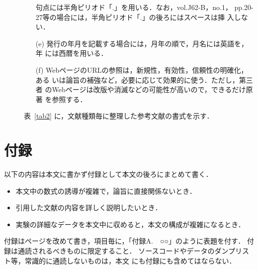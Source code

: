 \documentclass[main]{subfiles}
\begin{document}
\begin{description}
\begin{itemize}
	   句点には半角ピリオド「.」を用いる．なお，vol.J62-B，no.1，
	   pp.20-27等の場合には，半角ピリオド「.」の後ろにはスペースは挿
	   入しない．
\item[(e)] 発行の年月を記載する場合には，月年の順で，月名には英語を，年
	   には西暦を用いる．
\item[(f)] WebページのURLの参照は，新規性，有効性，信頼性の明確化，ある
	   いは論旨の補強など，必要に応じて効果的に使う．ただし，第三者
	   のWebページは改版や消滅などの可能性が高いので，できるだけ原著
	   を参照する．
\end{itemize}
表~\ref{tab2} に，文献種類毎に整理した参考文献の書式を示す．
\end{description}



\section{付録}
以下の内容は本文に書かず付録として本文の後ろにまとめて書く．

\begin{itemize}
\item 本文中の数式の誘導が複雑で，論旨に直接関係ないとき．
\item 引用した文献の内容を詳しく説明したいとき．
\item 実験の詳細なデータを本文中に収めると，本文の構成が複雑になるとき．
\end{itemize}

付録はページを改めて書き，項目毎に，「付録A.　○○」のように表題を付す．
付録は通読されるべきものに限定すること．
ソースコードやデータのダンプリスト等，常識的に通読しないものは，本文
にも付録にも含めてはならない．
\end{document}
